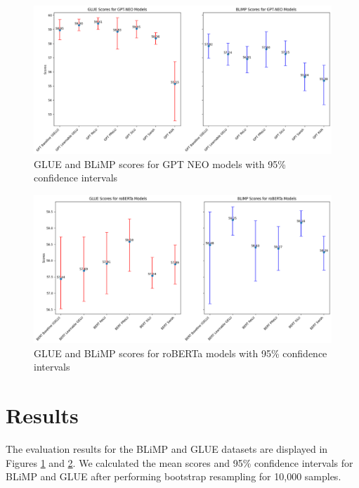 
\begin{figure}[ht]
    \centering
    \includegraphics[width=\columnwidth * 2]{figures/gpt-intervals.png}
    \caption{GLUE and BLiMP scores for GPT NEO models with 95\% confidence intervals}
    \label{fig:gpt-intervals}
\end{figure}

\begin{figure}[h]
    \centering
    \includegraphics[width=\columnwidth * 2]{figures/roberta-intervals.png}
    \caption{GLUE and BLiMP scores for roBERTa models with 95\% confidence intervals}
    \label{fig:roberta-intervals}
\end{figure}

\section{Results} %
\label{sec:results}
The evaluation results for the BLiMP and GLUE datasets are displayed in Figures \ref{fig:gpt-intervals} and \ref{fig:roberta-intervals}. We calculated the mean scores and 95\% confidence intervals for BLiMP and GLUE after performing bootstrap resampling for 10,000 samples.

